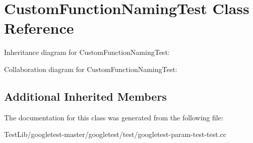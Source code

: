 \hypertarget{classCustomFunctionNamingTest}{}\section{Custom\+Function\+Naming\+Test Class Reference}
\label{classCustomFunctionNamingTest}


Inheritance diagram for Custom\+Function\+Naming\+Test\+:


Collaboration diagram for Custom\+Function\+Naming\+Test\+:
\subsection*{Additional Inherited Members}


The documentation for this class was generated from the following file\+:\begin{DoxyCompactItemize}
\item 
Test\+Lib/googletest-\/master/googletest/test/googletest-\/param-\/test-\/test.\+cc\end{DoxyCompactItemize}
